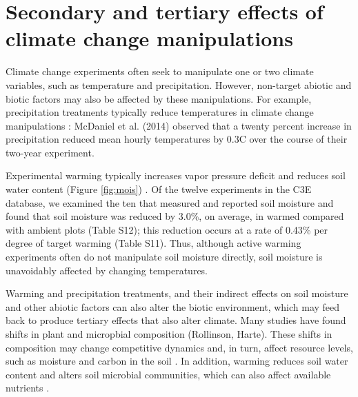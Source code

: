 \documentclass{article}
\begin{document}
\section* {Secondary and tertiary effects of climate change manipulations} 
Climate change experiments often seek to manipulate one or two climate variables, such as temperature and precipitation. However, non-target abiotic and biotic factors may also be affected by these manipulations. For example, precipitation treatments typically reduce temperatures in climate change manipulations \citep{sherry2007,rollinson2012,mcdaniel2014}: McDaniel et al. (2014) observed that a twenty percent increase in precipitation reduced mean hourly temperatures by 0.3\degree C over the course of their two-year experiment.

\par Experimental warming typically increases vapor pressure deficit and reduces soil water content (Figure \ref{fig:mois}) \citep[e.g.,][]{sherry2007,morin2010,templer2016}. Of the twelve experiments in the C3E database, we examined the ten that measured and reported soil moisture and found that soil moisture was reduced by 3.0\%, on average, in warmed compared with ambient plots (Table S12); this reduction occurs at a rate of 0.43\% per degree of target warming (Table S11). Thus, although active warming experiments often do not manipulate soil moisture directly, soil moisture is unavoidably affected by changing temperatures. %

\par Warming and precipitation treatments, and their indirect effects on soil moisture and other abiotic factors can also alter the biotic environment, which may feed back to produce tertiary effects that also alter climate. Many studies have found shifts in plant and micropbial composition (Rollinson, Harte). These shifts in composition may change competitive dynamics and, in turn, affect resource levels, such as moisture and carbon in the soil \citep{harte2015}. In addition, warming reduces soil water content and alters soil microbial communities, which can also affect available nutrients \citep{mcdaniel2014,mcdaniel2014b}. %
\end{document}
